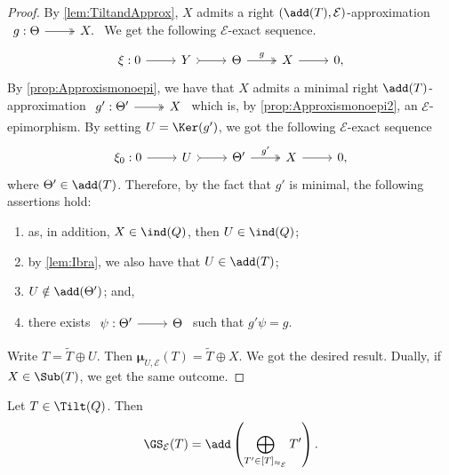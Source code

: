 \begin{proof}
    By \cref{lem:TiltandApprox}, $X$ admits a right $(\add(T), \mathcal{E})$-approximation$\begin{tikzcd}
	g : \Theta & X.
	\arrow[two heads,from=1-1, to=1-2]
    \end{tikzcd}$ We get the following $\mathcal{E}$-exact sequence.
     \[\begin{tikzcd}
	\xi : 0 & Y & \Theta  & X &  0,
	\arrow[from=1-1, to=1-2]
	\arrow[tail, from=1-2, to=1-3]
	\arrow["g",two heads,from=1-3, to=1-4]
	\arrow[from=1-4, to=1-5]
    \end{tikzcd} \]
    By \cref{prop:Approxismonoepi}, we have that $X$ admits a minimal right $\add(T)$-approximation $\begin{tikzcd}
	g': \Theta' & X 
        \arrow[two heads,from=1-1, to=1-2]
    \end{tikzcd}$ which is, by \cref{prop:Approxismonoepi2}, an $\mathcal{E}$-epimorphism. By setting $U = \Ker(g')$, we got the following $\mathcal{E}$-exact sequence
    \[\begin{tikzcd}
	\xi_0 : 0 & U & \Theta' & X &  0,
	\arrow[from=1-1, to=1-2]
	\arrow[tail, from=1-2, to=1-3]
	\arrow["g'",two heads,from=1-3, to=1-4]
	\arrow[from=1-4, to=1-5]
    \end{tikzcd} \] 
    where $\Theta' \in \add(T)$. Therefore, by the fact that $g'$ is minimal, the following assertions hold:
    \begin{enumerate}[label=$\bullet$, itemsep=1mm]
        \item as, in addition, $X \in \ind(Q)$, then $U \in \ind(Q)$;  
        \item by \cref{lem:Ibra}, we also have that $U \in \add(T)$;
        \item $U \notin \add(\Theta')$; and,
        \item there exists $\begin{tikzcd}
	\psi: \Theta' & \Theta
        \arrow[from=1-1, to=1-2]
    \end{tikzcd}$ such that $g' \psi = g$.
    \end{enumerate}  
    
     Write $T = \widetilde{T} \oplus U$. Then $\pmb{\mu}_{U,\mathcal{E}}(T) = \widetilde{T} \oplus X$. We got the desired result. Dually, if $X \in \Sub(T)$, we get the same outcome. \qedhere
\end{proof}

\begin{theorem}
\label{th:Treaching}
Let $T \in \Tilt(Q)$. Then \[\GS_{\mathcal{E}}(T) = \add\left(\bigoplus_{T' \in [T]_{\approx_{\mathcal{E}}}} T' \right).\]
\end{theorem}

